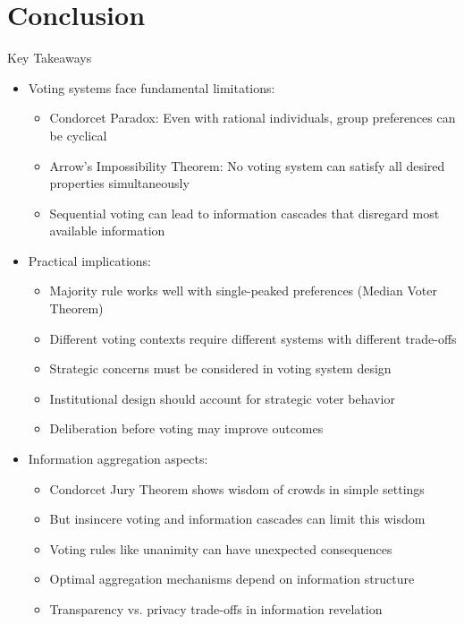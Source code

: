 \documentclass[10pt]{beamer}
\begin{document}
\section{Conclusion}

\begin{frame}{Key Takeaways}
  \begin{itemize}[<+->]
    \item Voting systems face fundamental limitations:
      \begin{itemize}
        \item Condorcet Paradox: Even with rational individuals, group preferences can be cyclical
        \item Arrow's Impossibility Theorem: No voting system can satisfy all desired properties simultaneously
        \item Sequential voting can lead to information cascades that disregard most available information
      \end{itemize}
    \item Practical implications:
      \begin{itemize}
        \item Majority rule works well with single-peaked preferences (Median Voter Theorem)
        \item Different voting contexts require different systems with different trade-offs
        \item Strategic concerns must be considered in voting system design
        \item Institutional design should account for strategic voter behavior
        \item Deliberation before voting may improve outcomes
      \end{itemize}
    \item Information aggregation aspects:
      \begin{itemize}
        \item Condorcet Jury Theorem shows wisdom of crowds in simple settings
        \item But insincere voting and information cascades can limit this wisdom
        \item Voting rules like unanimity can have unexpected consequences
        \item Optimal aggregation mechanisms depend on information structure
        \item Transparency vs. privacy trade-offs in information revelation
      \end{itemize}
  \end{itemize}
\end{frame}
\end{document}
